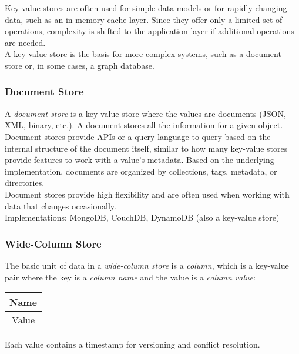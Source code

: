 \documentclass[12pt, titlepage]{article}
\begin{document}
Key-value stores are often used for simple data models or for rapidly-changing data, such as an in-memory cache layer. Since they offer only a limited set of operations, complexity is shifted to the application layer if additional operations are needed. \\

A key-value store is the basis for more complex systems, such as a document store or, in some cases, a graph database.

\subsubsection{Document Store}

A \textit{document store} is a key-value store where the values are documents (JSON, XML, binary, etc.). A document stores all the information for a given object. \\

Document stores provide APIs or a query language to query based on the internal structure of the document itself, similar to how many key-value stores provide features to work with a value's metadata. Based on the underlying implementation, documents are organized by collections, tags, metadata, or directories. \\

Document stores provide high flexibility and are often used when working with data that changes occasionally. \\

Implementations: MongoDB, CouchDB, DynamoDB (also a key-value store)

\subsubsection{Wide-Column Store}

The basic unit of data in a \textit{wide-column store} is a \textit{column}, which is a key-value pair where the key is a \textit{column name} and the value is a \textit{column value}: \\

\begin{table}[H]
\centering
\begin{tabular}{|c|}
\hline
Name  \\ \hline
Value \\ \hline
\end{tabular}
\end{table}

Each value contains a timestamp for versioning and conflict resolution. \\
\end{document}
